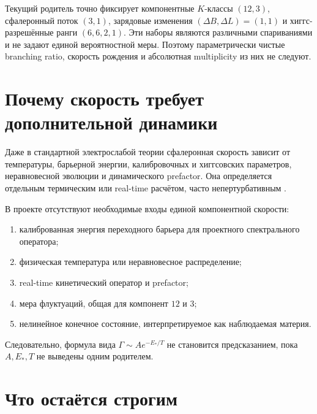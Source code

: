 \begin{theorem}
Текущий родитель точно фиксирует компонентные $K$-классы $(12,3)$,
сфалеронный поток $(3,1)$, зарядовые изменения
$(\Delta B,\Delta L)=(1,1)$ и хиггс-разрешённые ранги $(6,6,2,1)$.
Эти наборы являются различными спариваниями и не задают единой
вероятностной меры. Поэтому параметрически чистые branching ratio,
скорость рождения и абсолютная multiplicity из них не следуют.
\end{theorem}

\section{Почему скорость требует дополнительной динамики}

Даже в стандартной электрослабой теории сфалеронная скорость зависит от
температуры, барьерной энергии, калибровочных и хиггсовских параметров,
неравновесной эволюции и динамического prefactor. Она определяется
отдельным термическим или real-time расчётом, часто непертурбативным
\cite{component-observable-moore1998,
component-observable-barroso-moore2023}.

В проекте отсутствуют необходимые входы единой компонентной скорости:
\begin{enumerate}
 \item калиброванная энергия переходного барьера для проектного
 спектрального оператора;
 \item физическая температура или неравновесное распределение;
 \item real-time кинетический оператор и prefactor;
 \item мера флуктуаций, общая для компонент $12$ и $3$;
 \item нелинейное конечное состояние, интерпретируемое как наблюдаемая
 материя.
\end{enumerate}
Следовательно, формула вида $\Gamma\sim A e^{-E_*/T}$ не становится
предсказанием, пока $A,E_*,T$ не выведены одним родителем.

\section{Что остаётся строгим}

